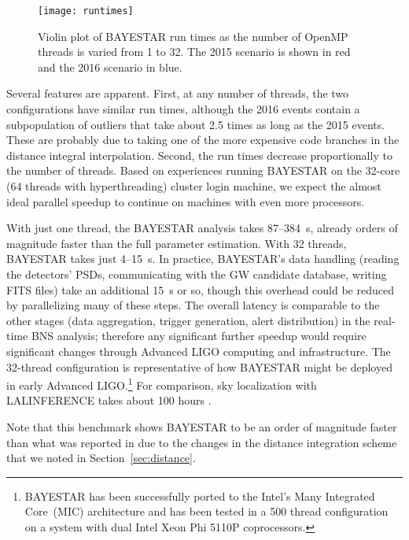 \documentclass[amsmath,amssymb,aps,prx,reprint,nopreprintnumbers,nofootinbib]{revtex4-1}
\begin{document}
\begin{figure}
    \centering
    \texttt{[image: runtimes]}
    \caption[\acs{BAYESTAR} run time]{\label{fig:runtimes}Violin plot of \ac{BAYESTAR} run times as the number of OpenMP threads is varied from 1 to 32. The 2015 scenario is shown in red and the 2016 scenario in blue.}
\end{figure}

Several features are apparent. First, at any number of threads, the two configurations have similar run times, although the 2016 events contain a subpopulation of outliers that take about 2.5 times as long as the 2015 events. These are probably due to taking one of the more expensive code branches in the distance integral interpolation. Second, the run times decrease proportionally to the number of threads. Based on experiences running \ac{BAYESTAR} on the 32\nobreakdashes-core (64 threads with hyperthreading) cluster login machine, we expect the almost ideal parallel speedup to continue on machines with even more processors.

With just one thread, the \ac{BAYESTAR} analysis takes 87\nobreakdashes--384~s, already orders of magnitude faster than the full parameter estimation. With 32 threads, \ac{BAYESTAR} takes just 4\nobreakdashes--15~s. In practice, \ac{BAYESTAR}'s data handling (reading the detectors' \acp{PSD}, communicating with the \ac{GW} candidate database, writing FITS files) take an additional 15~s or so, though this overhead could be reduced by parallelizing many of these steps. The overall latency is comparable to the other stages (data aggregation, trigger generation, alert distribution) in the real\nobreakdashes-time \ac{BNS} analysis; therefore any significant further speedup would require significant changes through Advanced \acs{LIGO} computing and infrastructure. The 32\nobreakdashes-thread configuration is representative of how \ac{BAYESTAR} might be deployed in early Advanced \ac{LIGO}.\footnote{\ac{BAYESTAR} has been successfully ported to the Intel's Many Integrated Core~(MIC) architecture and has been tested in a 500 thread configuration on a system with dual Intel Xeon Phi 5110P coprocessors.} For comparison, sky localization with LALINFERENCE takes about 100 hours \cite{BerryLocalization}.

Note that this benchmark shows \ac{BAYESTAR} to be an order of magnitude faster than what was reported in \cite{leo-singer-thesis,BerryLocalization} due to the changes in the distance integration scheme that we noted in Section~\ref{sec:distance}.
\end{document}
